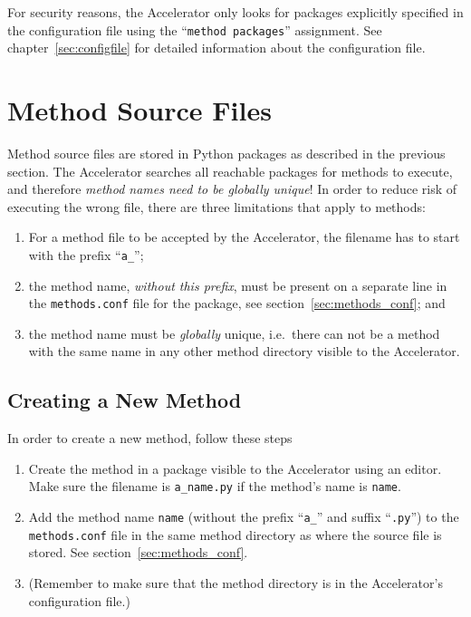 For security reasons, the Accelerator only looks for packages
explicitly specified in the configuration file using the
``\texttt{method packages}'' assignment.  See
chapter~\ref{sec:configfile} for detailed information about the
configuration file.



\section{Method Source Files}
Method source files are stored in Python packages as described in the
previous section.  The Accelerator searches all reachable packages for
methods to execute, and therefore \textsl{method names need to be
globally unique}!  In order to reduce risk of executing the wrong
file, there are three limitations that apply to methods:
\begin{enumerate}
\item For a method file to be accepted by the Accelerator, the
  filename has to start with the prefix ``\texttt{a\_}'';
\item the method name, \textsl{without this prefix}, must be present on a
  separate line in the \texttt{methods.conf} file for the package, see
  section~\ref{sec:methods_conf}; and
\item the method name must be \emph{globally} unique, i.e.\ there can
  not be a method with the same name in any other method directory
  visible to the Accelerator.
\end{enumerate}


\subsection{Creating a New Method}
In order to create a new method, follow these steps
\begin{enumerate}
\item Create the method in a package visible to the Accelerator
  using an editor.  Make sure the filename is \texttt{a\_name.py} if
  the method's name is \texttt{name}.
\item Add the method name \texttt{name} (without the prefix ``\texttt{a\_}'' and
  suffix ``\texttt{.py}'') to the \texttt{methods.conf} file in the
  same method directory as where the source file is stored.  See
  section~\ref{sec:methods_conf}.
\item (Remember to make sure that the method directory is in the Accelerator's
  configuration file.)
\end{enumerate}


